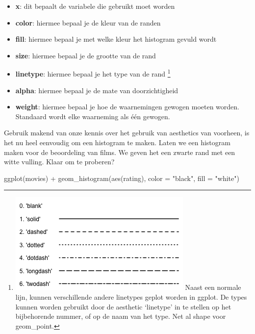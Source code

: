 \documentclass[]{tufte-book}
\newenvironment{Shaded}{}{}
\newcommand{\AttributeTok}[1]{\textcolor[rgb]{0.49,0.56,0.16}{#1}}
\newcommand{\FunctionTok}[1]{\textcolor[rgb]{0.02,0.16,0.49}{#1}}
\newcommand{\NormalTok}[1]{#1}
\newcommand{\SpecialCharTok}[1]{\textcolor[rgb]{0.25,0.44,0.63}{#1}}
\newcommand{\StringTok}[1]{\textcolor[rgb]{0.25,0.44,0.63}{#1}}
\providecommand{\tightlist}{%
  \setlength{\itemsep}{0pt}\setlength{\parskip}{0pt}}
\begin{document}
\begin{itemize}
\tightlist
\item
  \textbf{x}: dit bepaalt de variabele die gebruikt moet worden
\item
  \textbf{color}: hiermee bepaal je de kleur van de randen
\item
  \textbf{fill}: hiermee bepaal je met welke kleur het histogram gevuld wordt
\item
  \textbf{size}: hiermee bepaal je de grootte van de rand
\item
  \textbf{linetype}: hiermee bepaal je het type van de rand \footnote{\includegraphics{images/line_types.png} Naast een normale lijn, kunnen verschillende andere linetypes geplot worden in ggplot. De types kunnen worden gebruikt door de aesthetic `linetype' in te stellen op het bijbehorende nummer, of op de naam van het type. Net al shape voor geom\_point.}
\item
  \textbf{alpha}: hiermee bepaal je de mate van doorzichtigheid
\item
  \textbf{weight}: hiermee bepaal je hoe de waarnemingen gewogen moeten worden. Standaard wordt elke waarneming als één gewogen.
\end{itemize}

Gebruik makend van onze kennis over het gebruik van aesthetics van voorheen, is het nu heel eenvoudig om een histogram te maken. Laten we een histogram maken voor de beoordeling van films. We geven het een zwarte rand met een witte vulling. Klaar om te proberen?

\begin{Shaded}
\begin{Highlighting}[]
\FunctionTok{ggplot}\NormalTok{(movies) }\SpecialCharTok{+}
  \FunctionTok{geom\_histogram}\NormalTok{(}\FunctionTok{aes}\NormalTok{(rating), }\AttributeTok{color =} \StringTok{"black"}\NormalTok{, }\AttributeTok{fill =} \StringTok{"white"}\NormalTok{)}
\end{Highlighting}
\end{Shaded}
\end{document}
